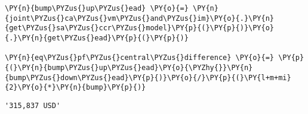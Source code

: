 \begin{tcolorbox}[breakable, size=fbox, boxrule=1pt, pad at break*=1mm,colback=cellbackground, colframe=cellborder]
\begin{Verbatim}[commandchars=\\\{\}]
\PY{n}{bump\PYZus{}up\PYZus{}ead} \PY{o}{=} \PY{n}{joint\PYZus{}ca\PYZus{}vm\PYZus{}and\PYZus{}im}\PY{o}{.}\PY{n}{get\PYZus{}sa\PYZus{}ccr\PYZus{}model}\PY{p}{(}\PY{p}{)}\PY{o}{.}\PY{n}{get\PYZus{}ead}\PY{p}{(}\PY{p}{)}

\PY{n}{eq\PYZus{}pf\PYZus{}central\PYZus{}difference} \PY{o}{=} \PY{p}{(}\PY{n}{bump\PYZus{}up\PYZus{}ead}\PY{o}{\PYZhy{}}\PY{n}{bump\PYZus{}down\PYZus{}ead}\PY{p}{)}\PY{o}{/}\PY{p}{(}\PY{l+m+mi}{2}\PY{o}{*}\PY{n}{bump}\PY{p}{)}
\end{Verbatim}
\end{tcolorbox}

            \begin{tcolorbox}[breakable, size=fbox, boxrule=.5pt, pad at break*=1mm, opacityfill=0]
\begin{Verbatim}[commandchars=\\\{\}]
'315,837 USD'
\end{Verbatim}
\end{tcolorbox}
        
